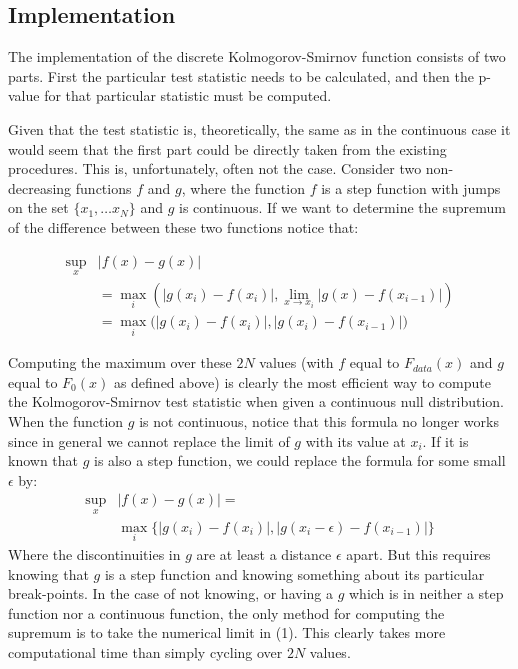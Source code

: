 \subsection{Implementation}

The implementation of the discrete Kolmogorov-Smirnov function consists of two parts. First the particular test statistic needs to be calculated,
and then the p-value for that particular statistic must be computed. 

Given that the test statistic is, theoretically, the same as in the
continuous case it would seem that the first part could be directly taken from the existing procedures. This is, unfortunately, often not the case.
Consider two non-decreasing functions $f$ and $g$, where the function $f$ is a step function with jumps on the set $\{x_1, \ldots x_N \}$ and $g$
is continuous. If we want to determine the supremum of the difference between these two functions notice that:

\begin{align*}
\sup_x &\left| f(x)- g(x) \right|   \\
       &= \max_i \left( \left|g(x_i) - f(x_i) \right|, \lim_{x \rightarrow x_i} \left| g(x) - f(x_{i-1}) \right| \right) \\
&=  \max_i \bigg( \left|g(x_i) - f(x_i) \right|, \left| g(x_i) - f(x_{i-1}) \right| \bigg)
\end{align*}

Computing the maximum over these $2N$ values (with $f$ equal to $F_{data}(x)$ and $g$ equal to $F_0(x)$ as defined above) is clearly the 
most efficient way to compute the Kolmogorov-Smirnov test statistic when given a continuous null distribution. When the function $g$ is not
continuous, notice that this formula no longer works since in general we cannot replace the limit of $g$ with its value at $x_i$. If it is known that $g$
is also a step function, we could replace the formula for some small $\epsilon$ by:
\begin{align*}
\sup_x &\left| f(x)- g(x) \right| =   \\
        &                    \max_i \{ \left|g(x_i) - f(x_i) \right|, \left| g(x_i - \epsilon) - f(x_{i-1}) \right| \}
\end{align*}
Where the discontinuities in $g$ are at least a distance $\epsilon$ apart. But this requires knowing that $g$ is a step function and knowing something
about its particular break-points. In the case of not knowing,
or having a $g$ which is in neither a step function nor a continuous function, the only method for computing the supremum is to take the numerical limit in (1). 
This clearly takes more computational time than simply cycling over $2N$ values. 

